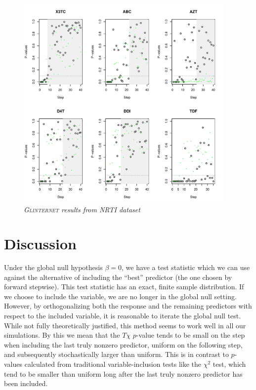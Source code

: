 \documentclass{imsart}
\begin{document}
\begin{figure}[!htp]
\begin{center}
\includegraphics[width=0.95\textwidth]{../figs/HIV_NRTI_glint.pdf}
\caption{\small \it \textsc{Glinternet} results from NRTI dataset}
\label{fig:HIVNRTI:glint}
\end{center}
\end{figure}





\section{Discussion}
\label{sec:discuss}

Under the global null hypothesis $\beta = 0$, we have a test statistic
which we can use against the alternative of including the ``best''
predictor (the one chosen by forward stepwise).
This test statistic has an exact, finite sample distribution.
If we choose to include the variable, we are no longer in the global null
setting. However, by orthogonalizing both the response and the remaining
predictors with respect to the included variable, it is reasonable to
iterate the global null test. While not fully theoretically justified,
this method seems to work well in all our simulations. By this we mean that
the $T\chi$ $p$-value tends to be small on the step when including the last truly
nonzero predictor, uniform on the following step, and subsequently
stochastically larger than uniform. This is in contrast to $p$-values
calculated from traditional variable-inclusion tests like the $\chi^2$
test, which tend to be smaller than uniform long after the last truly
nonzero predictor has been included.
\end{document}
